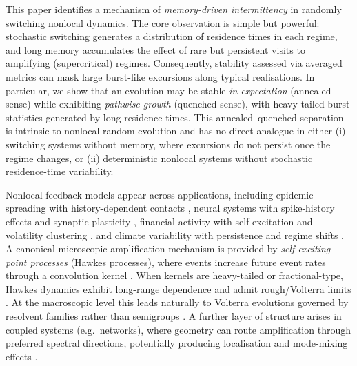 \documentclass[12pt,a4paper]{article}
\theoremstyle{plain}
\theoremstyle{definition}
\theoremstyle{remark}
\begin{document}
	This paper identifies a mechanism of \emph{memory-driven intermittency} in randomly switching nonlocal dynamics.
	The core observation is simple but powerful: stochastic switching generates a distribution of residence times in each regime, and long
	memory accumulates the effect of rare but persistent visits to amplifying (supercritical) regimes.
	Consequently, stability assessed via averaged metrics can mask large burst-like excursions along typical realisations.
	In particular, we show that an evolution may be stable \emph{in expectation} (annealed sense) while exhibiting \emph{pathwise growth}
	(quenched sense), with heavy-tailed burst statistics generated by long residence times.
	This annealed--quenched separation is intrinsic to nonlocal random evolution and has no direct analogue in either
	(i) switching systems without memory, where excursions do not persist once the regime changes, or
	(ii) deterministic nonlocal systems without stochastic residence-time variability.
	
	Nonlocal feedback models appear across applications, including epidemic spreading with history-dependent contacts
	\cite{keeling2008modeling,pastorsatorras2015epidemic}, neural systems with spike-history effects and synaptic plasticity
	\cite{gerstner2014neuronal,truccolo2005point}, financial activity with self-excitation and volatility clustering
	\cite{engle1982autoregressive,bacry2015hawkes}, and climate variability with persistence and regime shifts
	\cite{franzke2015stochastic,lovejoy2013weather}.
	A canonical microscopic amplification mechanism is provided by \emph{self-exciting point processes} (Hawkes processes), where events
	increase future event rates through a convolution kernel \cite{hawkes1971spectra,bremaud1996}.
	When kernels are heavy-tailed or fractional-type, Hawkes dynamics exhibit long-range dependence and admit rough/Volterra limits
	\cite{jaisson2015limit,jaisson2016rough,chevallier2019}.
	At the macroscopic level this leads naturally to Volterra evolutions governed by resolvent families rather than semigroups
	\cite{pruss1993evolution,bazhlekova2000fractional}.
	A further layer of structure arises in coupled systems (e.g.\ networks), where geometry can route amplification through preferred
	spectral directions, potentially producing localisation and mode-mixing effects \cite{trefethen2005,benaych2018,bordenave2020}.
	
\end{document}
